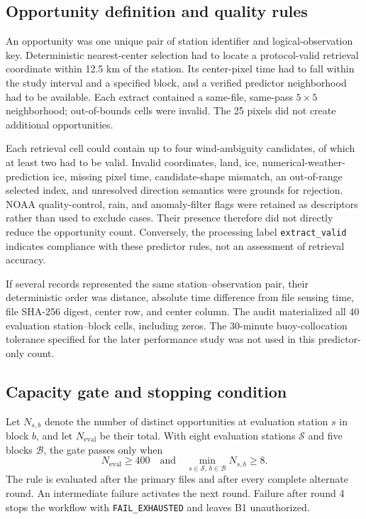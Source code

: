 \subsection{Opportunity definition and quality rules}
An opportunity was one unique pair of station identifier and logical-observation key. Deterministic nearest-center selection had to locate a protocol-valid retrieval coordinate within 12.5 km of the station. Its center-pixel time had to fall within the study interval and a specified block, and a verified predictor neighborhood had to be available. Each extract contained a same-file, same-pass $5\times5$ neighborhood; out-of-bounds cells were invalid. The 25 pixels did not create additional opportunities.

Each retrieval cell could contain up to four wind-ambiguity candidates, of which at least two had to be valid. Invalid coordinates, land, ice, numerical-weather-prediction ice, missing pixel time, candidate-shape mismatch, an out-of-range selected index, and unresolved direction semantics were grounds for rejection. NOAA quality-control, rain, and anomaly-filter flags were retained as descriptors rather than used to exclude cases. Their presence therefore did not directly reduce the opportunity count. Conversely, the processing label \texttt{extract\_valid} indicates compliance with these predictor rules, not an assessment of retrieval accuracy.

If several records represented the same station--observation pair, their deterministic order was distance, absolute time difference from file sensing time, file SHA-256 digest, center row, and center column. The audit materialized all 40 evaluation station--block cells, including zeros. The 30-minute buoy-collocation tolerance specified for the later performance study was not used in this predictor-only count.

\subsection{Capacity gate and stopping condition}
Let $N_{s,b}$ denote the number of distinct opportunities at evaluation station $s$ in block $b$, and let $N_{\mathrm{eval}}$ be their total. With eight evaluation stations $\mathcal{S}$ and five blocks $\mathcal{B}$, the gate passes only when
\begin{equation}
N_{\mathrm{eval}}\geq400
\quad\text{and}\quad
\min_{s\in\mathcal{S},\,b\in\mathcal{B}}N_{s,b}\geq8.
\label{eq:gate}
\end{equation}
The rule is evaluated after the primary files and after every complete alternate round. An intermediate failure activates the next round. Failure after round 4 stops the workflow with \texttt{FAIL\_EXHAUSTED} and leaves B1 unauthorized.

